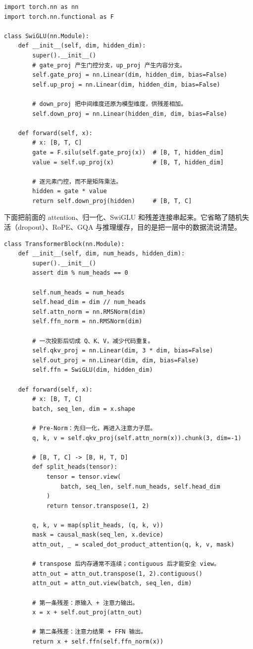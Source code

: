 \begin{lstlisting}
import torch.nn as nn
import torch.nn.functional as F

class SwiGLU(nn.Module):
    def __init__(self, dim, hidden_dim):
        super().__init__()
        # gate_proj 产生门控分支，up_proj 产生内容分支。
        self.gate_proj = nn.Linear(dim, hidden_dim, bias=False)
        self.up_proj = nn.Linear(dim, hidden_dim, bias=False)

        # down_proj 把中间维度还原为模型维度，供残差相加。
        self.down_proj = nn.Linear(hidden_dim, dim, bias=False)

    def forward(self, x):
        # x: [B, T, C]
        gate = F.silu(self.gate_proj(x))  # [B, T, hidden_dim]
        value = self.up_proj(x)           # [B, T, hidden_dim]

        # 逐元素门控，而不是矩阵乘法。
        hidden = gate * value
        return self.down_proj(hidden)     # [B, T, C]
\end{lstlisting}


下面把前面的 attention、归一化、SwiGLU 和残差连接串起来。它省略了随机失活（dropout）、RoPE、GQA 与推理缓存，目的是把一层中的数据流说清楚。

\begin{lstlisting}
class TransformerBlock(nn.Module):
    def __init__(self, dim, num_heads, hidden_dim):
        super().__init__()
        assert dim % num_heads == 0

        self.num_heads = num_heads
        self.head_dim = dim // num_heads
        self.attn_norm = nn.RMSNorm(dim)
        self.ffn_norm = nn.RMSNorm(dim)

        # 一次投影后切成 Q、K、V，减少代码重复。
        self.qkv_proj = nn.Linear(dim, 3 * dim, bias=False)
        self.out_proj = nn.Linear(dim, dim, bias=False)
        self.ffn = SwiGLU(dim, hidden_dim)

    def forward(self, x):
        # x: [B, T, C]
        batch, seq_len, dim = x.shape

        # Pre-Norm：先归一化，再进入注意力子层。
        q, k, v = self.qkv_proj(self.attn_norm(x)).chunk(3, dim=-1)

        # [B, T, C] -> [B, H, T, D]
        def split_heads(tensor):
            tensor = tensor.view(
                batch, seq_len, self.num_heads, self.head_dim
            )
            return tensor.transpose(1, 2)

        q, k, v = map(split_heads, (q, k, v))
        mask = causal_mask(seq_len, x.device)
        attn_out, _ = scaled_dot_product_attention(q, k, v, mask)

        # transpose 后内存通常不连续；contiguous 后才能安全 view。
        attn_out = attn_out.transpose(1, 2).contiguous()
        attn_out = attn_out.view(batch, seq_len, dim)

        # 第一条残差：原输入 + 注意力输出。
        x = x + self.out_proj(attn_out)

        # 第二条残差：注意力结果 + FFN 输出。
        return x + self.ffn(self.ffn_norm(x))
\end{lstlisting}


